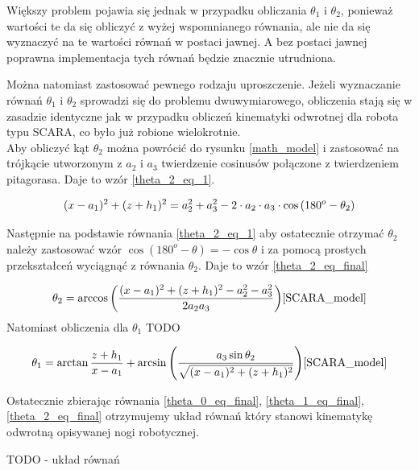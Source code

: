 \documentclass[a4paper,13pt]{article}
\begin{document}
Większy problem pojawia się jednak w przypadku obliczania $\theta_1$ i $\theta_2$, ponieważ wartości te da się obliczyć z wyżej wspomnianego równania, ale nie da się wyznaczyć na te wartości równań w postaci jawnej. A bez postaci jawnej poprawna implementacja tych równań będzie znacznie utrudniona.

Można natomiast zastosować pewnego rodzaju uproszczenie. Jeżeli wyznaczanie równań $\theta_1$ i $\theta_2$ sprowadzi się do problemu dwuwymiarowego, obliczenia stają się w zasadzie identyczne jak w przypadku obliczeń kinematyki odwrotnej dla robota typu SCARA, co było już robione wielokrotnie.\\

Aby obliczyć kąt $\theta_2$ można powrócić do rysunku \ref{math_model} i zastosować na trójkącie utworzonym z $a_2$ i $a_3$ twierdzenie cosinusów połączone z twierdzeniem pitagorasa. Daje to wzór \ref{theta_2_eq_1}.

\begin{equation} \label{theta_2_eq_1}
(x - a_1)^2 + (z + h_1)^2 = a_2^2 + a_3^2 - 2 \cdot a_2 \cdot a_3 \cdot \cos{(180^o - \theta_2)}\\
\end{equation}

Następnie na podstawie równania \ref{theta_2_eq_1} aby ostatecznie otrzymać $\theta_2$ należy zastosować wzór $\cos{(180^o - \theta)} = -\cos{\theta}$ i za pomocą prostych przekształceń wyciągnąć z równania $\theta_2$. Daje to wzór \ref{theta_2_eq_final}

\begin{equation} \label{theta_2_eq_final}
\theta_2 = \arccos{\left( \frac{(x - a_1)^2 + (z + h_1)^2 - a_2^2 - a_3^2}{2 a_2 a_3} \right)}\\ \cite{SCARA_model}
\end{equation}
Natomiast obliczenia dla $\theta_1$ TODO

\begin{equation}\label{theta_1_eq_final}
\theta_1 = \arctan{\frac{z + h_1}{x - a_1}} + \arcsin{\left( \frac{a_3 \sin{\theta_2} }{ \sqrt{ (x - a_1)^2 + (z + h_1)^2}} \right)}\\ \cite{SCARA_model}
\end{equation}

Ostatecznie zbierając równania \ref{theta_0_eq_final}, \ref{theta_1_eq_final}, \ref{theta_2_eq_final} otrzymujemy układ równań który stanowi kinematykę odwrotną opisywanej nogi robotycznej.

TODO - układ równań
\end{document}
